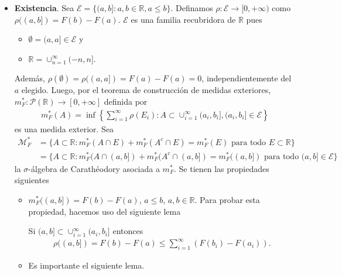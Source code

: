 \begin{itemize}
    \item \textbf{Existencia}. Sea $\mathcal{E} = \{ (a,b] : a,b \in \mathbb{R}, a \leq b \}$. Definamos $\rho : \mathcal{E} \longrightarrow [0,+\infty)$ como $\rho((a,b]) = F(b) - F(a)$. $\mathcal{E}$ es una familia recubridora de $\mathbb{R}$ pues
          \begin{itemize}
              \item $\emptyset = (a,a] \in \mathcal{E}$ y
              \item $\mathbb{R} = \cup_{n=1}^{\infty}(-n,n]$.
          \end{itemize}
          Además, $\rho(\emptyset) = \rho((a,a]) = F(a) - F(a) = 0$, independientemente del $a$ elegido. Luego, por el teorema de construcción de medidas exteriores, $m_F^*: \mathcal{P}(\mathbb{R}) \longrightarrow [0,+\infty]$ definida por
          \begin{align*}
              m_F^*(A) = \inf \left\{ \sum_{i=1}^{\infty}{\rho(E_i)} : A \subset \cup_{i=1}^{\infty}{(a_i,b_i]}, (a_i,b_i] \in \mathcal{E} \right\}
          \end{align*}
          es una medida exterior. Sea
          \begin{align*}
              \mathcal{M}_F^* & = \{ A \subset \mathbb{R} : m_F^*(A \cap E) + m_F^*(A^c \cap E) = m_F^*(E) \text{ para todo } E \subset \mathbb{R} \}              \\
                              & = \{ A \subset \mathbb{R} : m_F^*(A \cap (a,b]) + m_F^*(A^c \cap (a,b]) = m_F^*((a,b]) \text{ para todo } (a,b] \in \mathcal{E} \}
          \end{align*}
          la $\sigma$-álgebra de Carathéodory asociada a $m_F^*$. Se tienen las propiedades siguientes
          \begin{itemize}
              \item $m_F^*((a,b]) = F(b) - F(a)$, $a \leq b$, $a,b \in \mathbb{R}$. Para probar esta propiedad, hacemos uso del siguiente lema
                    \begin{lema}
                        Si $(a,b] \subset \cup_{i=1}^{\infty}{(a_i,b_i]}$ entonces
                        \begin{align*}
                            \rho((a,b]) = F(b) - F(a) \leq \sum_{i=1}^{\infty}(F(b_i) - F(a_i)).
                        \end{align*}
                    \end{lema}
              \item Es importante el siguiente lema.

\end{itemize}
\end{itemize}
